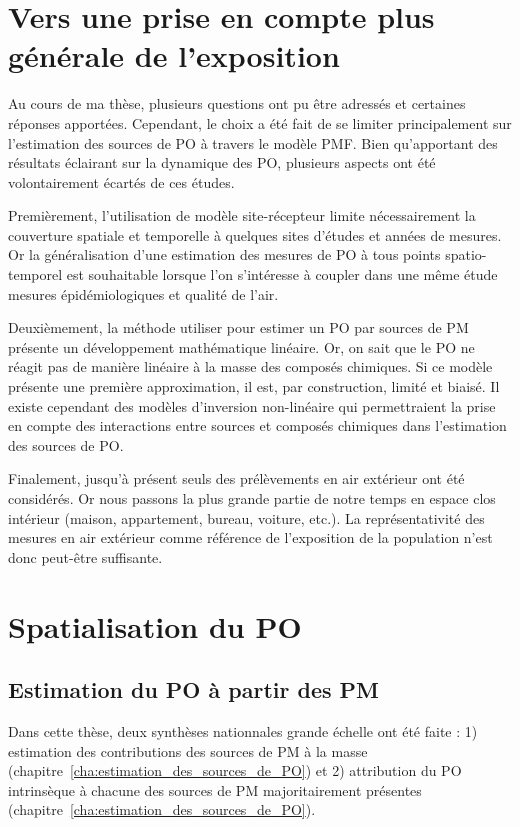 
\section{Vers une prise en compte plus générale de l'exposition}

Au cours de ma thèse, plusieurs questions ont pu être adressés et certaines réponses
apportées.  Cependant, le choix a été fait de se limiter principalement sur l'estimation
des sources de PO à travers le modèle PMF. Bien qu'apportant des résultats éclairant sur
la dynamique des PO, plusieurs aspects ont été volontairement écartés de ces études.

Premièrement, l'utilisation de modèle site-récepteur limite nécessairement la couverture
spatiale et temporelle à quelques sites d'études et années de mesures. Or la
généralisation d'une estimation des mesures de PO à tous points spatio-temporel est
souhaitable lorsque l'on s'intéresse à coupler dans une même étude mesures
épidémiologiques et qualité de l'air.

Deuxièmement, la méthode utiliser pour estimer un PO par sources de PM présente un
développement mathématique linéaire. Or, on sait que le PO ne réagit pas de manière
linéaire à la masse des composés chimiques. Si ce modèle présente une première
approximation, il est, par construction, limité et biaisé.  Il existe cependant des
modèles d'inversion non-linéaire qui permettraient la prise en compte des interactions
entre sources et composés chimiques dans l'estimation des sources de PO.

Finalement, jusqu'à présent seuls des prélèvements en air extérieur ont été considérés. Or
nous passons la plus grande partie de notre temps en espace clos intérieur (maison,
appartement, bureau, voiture, etc.).  La représentativité des mesures en air extérieur
comme référence de l'exposition de la population n'est donc peut-être suffisante.

\section{Spatialisation du PO}

\subsection{Estimation du PO à partir des PM}

Dans cette thèse, deux synthèses nationnales grande échelle ont été faite : 1) estimation
des contributions des sources de PM à la masse \autocite{weberComparison2019}
(chapitre~\ref{cha:estimation_des_sources_de_PO}) et 2) attribution du PO intrinsèque à
chacune des sources de PM majoritairement présentes \autocite{weberSourceinprep.}
(chapitre~\ref{cha:estimation_des_sources_de_PO}).

